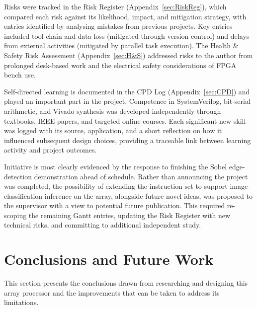     Risks were tracked in the Risk Register (Appendix~\ref{sec:RiskReg}), which compared each risk against its likelihood, impact, and mitigation strategy, with entries identified by analysing mistakes from previous projects. Key entries included tool-chain and data loss (mitigated through version control) and delays from external activities (mitigated by parallel task execution). The Health \& Safety Risk Assessment (Appendix~\ref{sec:H&S}) addressed risks to the author from prolonged desk-based work and the electrical safety considerations of FPGA bench use.
    
    Self-directed learning is documented in the CPD Log (Appendix~\ref{sec:CPD}) and played an important part in the project. Competence in SystemVerilog, bit-serial arithmetic, and Vivado synthesis was developed independently through textbooks, IEEE papers, and targeted online courses. Each significant new skill was logged with its source, application, and a short reflection on how it influenced subsequent design choices, providing a traceable link between learning activity and project outcomes.
    
    Initiative is most clearly evidenced by the response to finishing the Sobel edge-detection demonstration ahead of schedule. Rather than announcing the project was completed, the possibility of extending the instruction set to support image-classification inference on the array, alongside future novel ideas, was proposed to the supervisor with a view to potential future publication. This required re-scoping the remaining Gantt entries, updating the Risk Register with new technical risks, and committing to additional independent study.
      

\section{Conclusions and Future Work}\label{sec:conclusion}
    This section presents the conclusions drawn from researching and designing this array processor and the improvements that can be taken to address its limitations.
    
